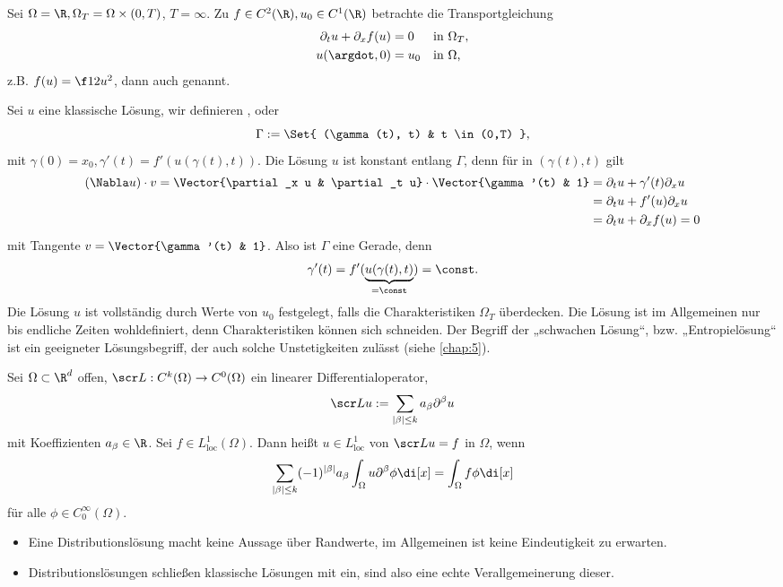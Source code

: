 \begin{ex} \label{1.26}
	Sei $\Omega = \R, \Omega_T = \Omega \times (0,T)$, $T = \infty$.
	Zu $f \in C^2(\R), u_0 \in C^1(\R)$ betrachte die Transportgleichung
	\begin{align*}
		\partial_t u + \partial_x f(u) &= 0 && \text{in $\Omega_T$}, \\
		u(\argdot, 0) &= u_0 && \text{in $\Omega$,}
	\end{align*}
	z.B. $f(u) = \f 12 u^2$, dann auch  genannt.

	Sei $u$ eine klassische Lösung, wir definieren , oder 
	\[
		\Gamma := \Set{ (\gamma(t), t) & t \in (0,T) },
	\]
	mit $\gamma(0) = x_0, \gamma'(t) = f'(u(\gamma(t), t))$.
	Die Lösung $u$ ist konstant entlang $\Gamma$, denn für in $(\gamma(t),t)$ gilt
	\begin{align*}
		(\Nabla u) \cdot v = \Vector{\partial_x u & \partial_t u} \cdot \Vector{\gamma'(t) & 1}
		&= \partial_t u + \gamma'(t)  \partial_x u \\
		&= \partial_t u + f'(u) \partial_x u \\
		&= \partial_t u + \partial_x f(u)
		= 0
	\end{align*}
	mit Tangente $v = \Vector{\gamma'(t) & 1}$.
	Also ist $\Gamma$ eine Gerade, denn
	\[
		\gamma'(t) = f'(\underbrace{u(\gamma(t), t)}_{=\const}) = \const.
	\]
	Die Lösung $u$ ist vollständig durch Werte von $u_0$ festgelegt, falls die Charakteristiken $\Omega_T$ überdecken.
	Die Lösung ist im Allgemeinen nur bis endliche Zeiten wohldefiniert, denn Charakteristiken können sich schneiden.
	Der Begriff der „schwachen Lösung“, bzw. „Entropielösung“ ist ein geeigneter Lösungsbegriff, der auch solche Unstetigkeiten zulässt (siehe \ref{chap:5}).
\end{ex}

\begin{df}[Distributionslösung] \label{1.27}
	Sei $\Omega \subset \R^d$ offen, $\scr L: C^k(\Omega) \to C^0(\Omega)$ ein linearer Differentialoperator,
	\[
		\scr L u := \sum_{|\beta| \le k} a_\beta \partial^\beta u
	\]
	mit Koeffizienten $a_\beta \in \R$.
	Sei $f \in L^1_{\text{loc}}(\Omega)$.
	Dann heißt $u\in L^1_{\text{loc}}$  von $\scr L u = f$ in $\Omega$, wenn
	\begin{equation} \label{eq:1.4}
		\sum_{|\beta|\le k} (-1)^{|\beta|} a_\beta \int_\Omega u \partial^\beta \phi \di[x]
		 = \int_\Omega f \phi \di[x]
	\end{equation}
	für alle $\phi \in C_0^\infty(\Omega)$.
	\begin{note}
		\begin{itemize}
			\item
				Eine Distributionslösung macht keine Aussage über Randwerte, im Allgemeinen ist keine Eindeutigkeit zu erwarten.
			\item
				Distributionslösungen schließen klassische Lösungen mit ein, sind also eine echte Verallgemeinerung dieser.
		\end{itemize}
	\end{note}
\end{df}

